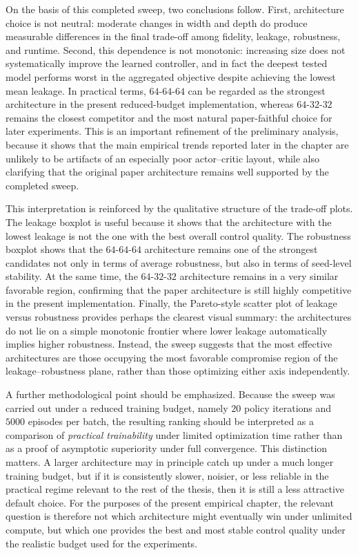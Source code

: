 On the basis of this completed sweep, two conclusions follow. First, architecture choice is not neutral: moderate changes in width and depth do produce measurable differences in the final trade-off among fidelity, leakage, robustness, and runtime. Second, this dependence is not monotonic: increasing size does not systematically improve the learned controller, and in fact the deepest tested model performs worst in the aggregated objective despite achieving the lowest mean leakage. In practical terms, \(64\text{-}64\text{-}64\) can be regarded as the strongest architecture in the present reduced-budget implementation, whereas \(64\text{-}32\text{-}32\) remains the closest competitor and the most natural paper-faithful choice for later experiments. This is an important refinement of the preliminary analysis, because it shows that the main empirical trends reported later in the chapter are unlikely to be artifacts of an especially poor actor--critic layout, while also clarifying that the original paper architecture remains well supported by the completed sweep.


This interpretation is reinforced by the qualitative structure of the trade-off plots. The leakage boxplot is useful because it shows that the architecture with the lowest leakage is not the one with the best overall control quality. The robustness boxplot shows that the \(64\text{-}64\text{-}64\) architecture remains one of the strongest candidates not only in terms of average robustness, but also in terms of seed-level stability. At the same time, the \(64\text{-}32\text{-}32\) architecture remains in a very similar favorable region, confirming that the paper architecture is still highly competitive in the present implementation. Finally, the Pareto-style scatter plot of leakage versus robustness provides perhaps the clearest visual summary: the architectures do not lie on a simple monotonic frontier where lower leakage automatically implies higher robustness. Instead, the sweep suggests that the most effective architectures are those occupying the most favorable compromise region of the leakage--robustness plane, rather than those optimizing either axis independently.

A further methodological point should be emphasized. Because the sweep was carried out under a reduced training budget, namely \(20\) policy iterations and \(5000\) episodes per batch, the resulting ranking should be interpreted as a comparison of \emph{practical trainability} under limited optimization time rather than as a proof of asymptotic superiority under full convergence. This distinction matters. A larger architecture may in principle catch up under a much longer training budget, but if it is consistently slower, noisier, or less reliable in the practical regime relevant to the rest of the thesis, then it is still a less attractive default choice. For the purposes of the present empirical chapter, the relevant question is therefore not which architecture might eventually win under unlimited compute, but which one provides the best and most stable control quality under the realistic budget used for the experiments.

